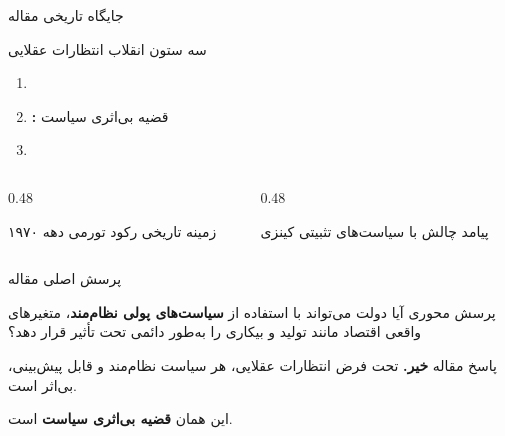 \documentclass[aspectratio=169,11pt]{beamer}
\newcommand{\highlight}[1]{\textcolor{AccentOrange}{\textbf{#1}}}
\newcommand{\important}[1]{\textcolor{AlertRed}{\textbf{#1}}}
\begin{document}
\begin{frame}{جایگاه تاریخی مقاله}
  \begin{block}{سه ستون انقلاب انتظارات عقلایی}
    \begin{enumerate}
      \item {}
      \item \highlight{:} قضیه بی‌اثری سیاست
      \item {}
    \end{enumerate}
  \end{block}
  \vspace{0.4cm}
  \begin{LTR}
  \begin{columns}[T]
    \begin{column}{0.48\textwidth}
      \begin{RTL}
      \begin{alertblock}{زمینه تاریخی}
        \centering
        رکود تورمی دهه ۱۹۷۰
      \end{alertblock}
      \end{RTL}
    \end{column}
    \hfill
    \begin{column}{0.48\textwidth}
      \begin{RTL}
      \begin{exampleblock}{پیامد}
        \centering
        چالش با سیاست‌های تثبیتی کینزی
      \end{exampleblock}
      \end{RTL}
    \end{column}
  \end{columns}
  \end{LTR}
\end{frame}

\begin{frame}{پرسش اصلی مقاله}
  \begin{block}{پرسش محوری}
    \centering
    \large
    آیا دولت می‌تواند با استفاده از \highlight{سیاست‌های پولی نظام‌مند}، متغیرهای واقعی اقتصاد مانند تولید و بیکاری را به‌طور دائمی تحت تأثیر قرار دهد؟
  \end{block}
  \vspace{0.5cm}
  \begin{alertblock}{پاسخ مقاله}
    \centering
    \large
    \important{خیر.} تحت فرض انتظارات عقلایی، هر سیاست نظام‌مند و قابل پیش‌بینی، بی‌اثر است.
    \vspace{0.2cm}

    این همان \important{قضیه بی‌اثری سیاست} است.
  \end{alertblock}
\end{frame}
\end{document}
